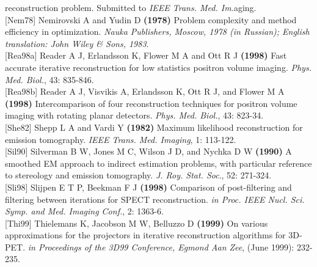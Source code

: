 \documentclass{article}
\begin{document}
reconstruction problem. Submitted to \textit{IEEE Trans. Med. Im.}aging.\\
{[}Nem78{]} Nemirovski A and Yudin D \textbf{(1978)} Problem complexity 
and method efficiency in optimization. \textit{Nauka Publishers, 
Moscow, 1978 (in Russian); English translation: John Wiley \& 
Sons, 1983}.\\
{[}Rea98a{]} Reader A J, Erlandsson K, Flower M A and Ott R J \textbf{(1998)} 
Fast accurate iterative reconstruction for low statistics positron 
volume imaging. \textit{Phys. Med. Biol.}, 43: 835-846.\\
{[}Rea98b{]} Reader A J, Visvikis A, Erlandsson K, Ott R J, and Flower 
M A \textbf{(1998)} Intercomparison of four reconstruction techniques 
for positron volume imaging with rotating planar detectors. \textit{Phys. 
Med. Biol.}, 43: 823-34.\\
{[}She82{]} Shepp L A and Vardi Y \textbf{(1982)} Maximum likelihood reconstruction 
for emission tomography. \textit{IEEE Trans. Med. Imaging}, 1: 113-122.\\
{[}Sil90{]} Silverman B W, Jones M C, Wilson J D, and Nychka D W \textbf{(1990)} 
A smoothed EM approach to indirect estimation problems, with 
particular reference to stereology and emission tomography. \textit{J. 
Roy. Stat. Soc}., 52: 271-324.\\
{[}Sli98{]} Slijpen E T P, Beekman F J \textbf{(1998)} Comparison of post-filtering 
and filtering between iterations for SPECT reconstruction. \textit{in 
Proc. IEEE Nucl. Sci. Symp. and Med. Imaging Conf.}, 2: 1363-6.\\
{[}Thi99{]} Thielemans K, Jacobson M W, Belluzzo D \textbf{(1999)} On 
various approximations for the projectors in iterative reconstruction 
algorithms for 3D-PET. \textit{in Proceedings of the 3D99 Conference, 
Egmond Aan Zee}, (June 1999): 232-235.
\end{document}
